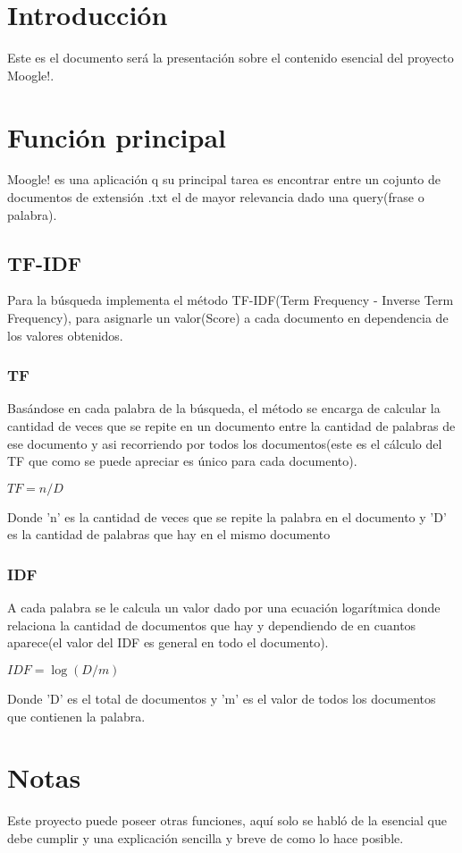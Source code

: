 \documentclass[100t]{article}
\begin{document}
		\maketitle
		\section{Introducción}
		Este es el documento será la presentación sobre el contenido esencial del proyecto  Moogle!.
		\section{Función principal}
		Moogle! es una aplicación q su principal tarea es encontrar entre un cojunto de documentos de extensión .txt el de mayor relevancia  dado una query(frase o palabra).
		\subsection{TF-IDF}
		Para la búsqueda implementa el método TF-IDF(Term Frequency - Inverse Term Frequency), para asignarle un valor(Score) a cada documento en dependencia de los valores obtenidos. 
		\subsubsection{TF}
		Basándose en cada palabra de la búsqueda, el método se encarga de calcular la cantidad de veces que se repite en un documento entre la cantidad de palabras de ese documento y asi recorriendo por todos los documentos(este es el cálculo del TF que como se puede apreciar es único para cada documento). 
		\begin{center}
			$TF = n/D$
		\end{center}
		Donde 'n' es la cantidad de veces que se repite la palabra en el documento y 'D' es la cantidad de palabras que hay en el mismo documento 
		\subsubsection{IDF}
		A cada palabra se le calcula un valor dado por una ecuación logarítmica donde relaciona la cantidad de documentos que hay y dependiendo de en cuantos aparece(el valor del IDF es general en todo el documento).
		\begin{center}
			$IDF = \log (D/m)$
		\end{center}
		Donde 'D' es el total de documentos y 'm' es el valor de todos los documentos que contienen la palabra.
		\section{Notas}
		Este proyecto puede poseer otras funciones, aquí solo se habló de la esencial que debe cumplir y una explicación sencilla y breve de como lo hace posible. 
		
		
	
\end{document}
